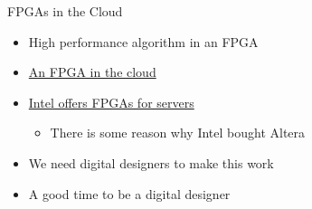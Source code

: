 \documentclass[xcolor=pdflatex,dvipsnames,table]{beamer}
\begin{document}
\begin{frame}[fragile]{FPGAs in the Cloud}
\begin{itemize}
\item High performance algorithm in an FPGA
\item \href{https://aws.amazon.com/ec2/instance-types/f1/}{An FPGA in the cloud}
\item \href{https://www.intel.com/content/www/us/en/products/docs/storage/programmable/applications/cloud.html}{Intel offers FPGAs for servers}
\begin{itemize}
\item There is some reason why Intel bought Altera
\end{itemize}
\item We need digital designers to make this work
\item A good time to be a digital designer
\end{itemize}
\end{frame}
\end{document}
